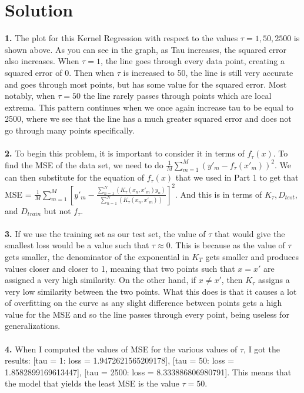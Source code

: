 \documentclass[submit]{harvardml}
\newenvironment{solution}
  {\color{blue}\section*{Solution}}
{}
\begin{document}
\begin{solution}
	\textbf{1.} The plot for this Kernel Regression with respect to the values 
  $\tau = 1, 50, 2500$ is shown above. As you can see in the graph, as Tau increases, the squared error also increases. When $\tau = 1$, the line goes through
  every data point, creating a squared error of 0. Then when $\tau$ is increased to 50, the line is still very accurate and goes through most points, 
  but has some value for the squared error. Most notably, when $\tau = 50$ the line rarely passes through points which are local extrema. This pattern continues when 
  we once again increase tau to be equal to 2500, where we see that the line has a much greater squared error and does not go through many points specifically. \\\\

  \textbf{2.} To begin this problem, it is important to consider it in terms of $f_\tau(x)$. To find the MSE of the data set, we need to do $\frac{1}{M} \sum_{m=1}^{M}(y'_m - f_\tau(x'_m))^2$. 
  We can then substitute for the equation of $f_\tau(x)$ that we used in Part 1 to get that 
  MSE = $\frac{1}{M} \sum_{m=1}^{M}[y'_m - \frac{\sum_{n=1}^{N}(K_\tau(x_n,x'_m)y_n)}{\sum_{n=1}^{N}(K_\tau(x_n, x'_m))}]^2$. And this is in terms of $K_\tau, D_{test},$ and $D_{train}$ but not 
  $f_\tau$. \\\\

  \textbf{3.} If we use the training set as our test set, the value of $\tau$ that would give the 
  smallest loss would be a value such that $\tau \approx 0$. This is because as the value of $\tau$ gets smaller,
  the denominator of the exponential in $K_T$ gets smaller and produces values closer and closer to 1, meaning that two points 
  such that $x = x'$ are assigned a very high similarity. On the other hand, if $x \neq x'$, then $K_\tau$ assigns a very low
  similarity between the two points. What this does is that it causes a lot of overfitting on the curve as any slight difference between 
  points gets a high value for the MSE and so the line passes through every point, being useless for generalizations. \\\\

  \textbf{4.} When I computed the values of MSE for the various values of $\tau$, I got the results: 
  [tau = 1: loss = 1.9472621565209178], [tau = 50: loss = 1.8582899169613447], [tau = 2500: loss = 8.333886806980791]. 
  This means that the model that yields the least MSE is the value $\tau = 50$. \\\\


\end{solution}
\end{document}
